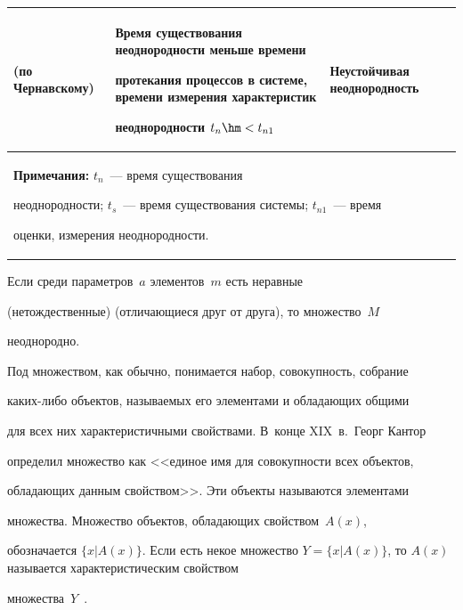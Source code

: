 \begin{table}
\begin{center}
\begin{tabular}{|p{30mm}|p{55mm}|p{25mm}|}
(по Чернавскому)&Время существования неоднород\-ности меньше времени 


протекания процессов в системе, времени измерения характеристик 


неоднородности $t_n\hm<t_{n1}$&Неустойчивая неоднородность\\


\hline


\multicolumn{3}{p{119mm}}{\footnotesize \textbf{Примечания:} $t_n$~--- время существования 


не\-од\-но\-род\-ности; $t_s$~--- время существования системы; $t_{n1}$~--- время 


оценки, измерения неоднородности.}


\end{tabular}


\end{center}


\vspace*{-12pt}


\end{table}


   


   Если среди параметров~$a$ элементов~$m$ есть неравные 


(нетождественные) (отличающиеся друг от друга), то множество~$M$ 


неоднородно.


   


   Под множеством, как обычно, понимается набор, совокупность, собрание 


ка\-ких-ли\-бо объектов, называемых его элементами и обладающих общими 


для всех них характеристичными свойствами. В~конце XIX~в.\ Георг Кантор 


определил множество как <<единое имя для совокупности всех объектов, 


обладающих данным свойством>>. Эти объекты называются элементами 


множества. Множество объектов, обладающих свойством~$A(x)$, 


обозначается $\{x \vert  A(x)\}$. Если есть некое множество $Y = \{x \vert  


A(x)\}$, то $A(x)$ называется характеристическим свойством 


множества~$Y$~\cite{14-2-15}.





